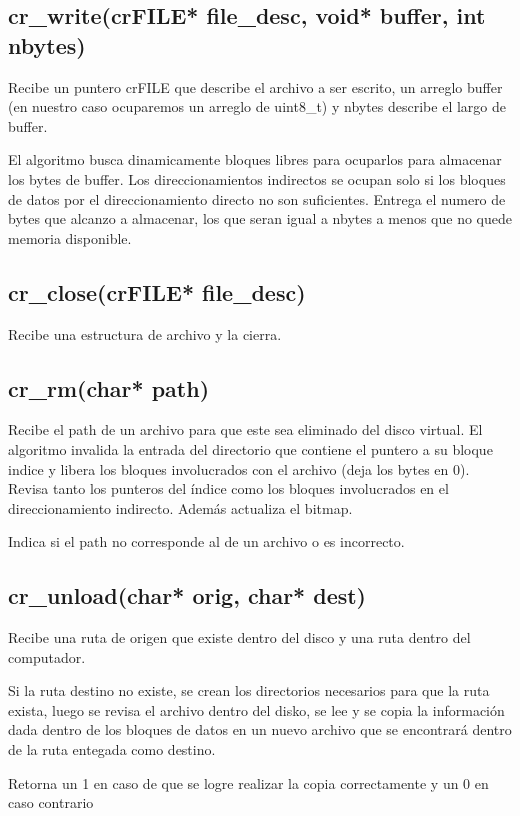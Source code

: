 \documentclass[12pt]{article}
\begin{document}
\subsection{cr\_write(crFILE* file\_desc, void* buffer, int nbytes)}
Recibe un puntero crFILE que describe el archivo a ser escrito, un arreglo buffer (en nuestro caso ocuparemos un arreglo de uint8\_t) y nbytes describe el largo de buffer.

El algoritmo busca dinamicamente bloques libres para ocuparlos para almacenar los bytes de buffer. Los direccionamientos indirectos se ocupan solo si los bloques de datos por el direccionamiento directo no son suficientes. Entrega el numero de bytes que alcanzo a almacenar, los que seran igual a nbytes a menos que no quede memoria disponible.



\subsection{cr\_close(crFILE* file\_desc)}
Recibe una estructura de archivo y la cierra.


\subsection{cr\_rm(char* path)}
Recibe el path de un archivo para que este sea eliminado del disco virtual. El algoritmo invalida la entrada del directorio que contiene el puntero a su bloque indice y libera los bloques involucrados con el archivo (deja los bytes en 0). Revisa tanto los punteros del índice como los bloques involucrados en el direccionamiento indirecto. Además actualiza el bitmap.

Indica si el path no corresponde al de un archivo o es incorrecto.

\subsection{cr\_unload(char* orig, char* dest)}
Recibe una ruta de origen que existe dentro del disco y una ruta dentro del computador.

Si la ruta destino no existe, se crean los directorios necesarios para que la ruta exista, luego se revisa el archivo dentro del disko, se lee y se copia la información dada dentro de los bloques de datos en un nuevo archivo que se encontrará dentro de la ruta entegada como destino.

Retorna un 1 en caso de que se logre realizar la copia correctamente y un 0 en caso contrario
\end{document}
